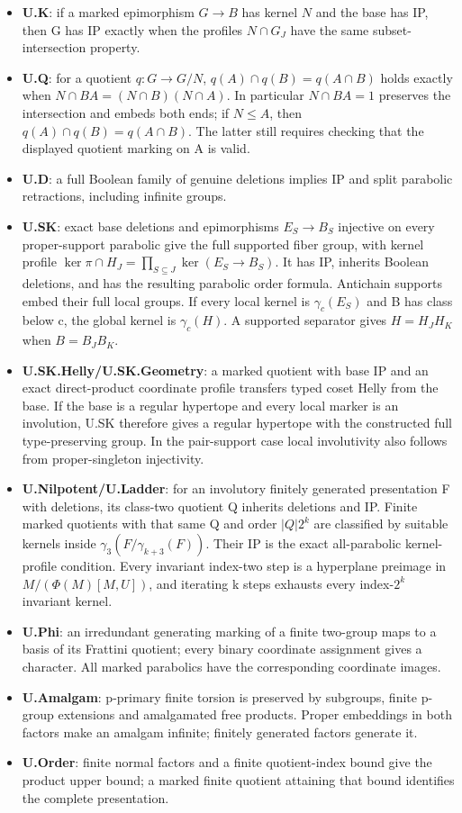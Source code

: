 \documentclass[
  11pt,
  a4paper,
]{article}
\begin{document}
\begin{itemize}
\item
  \textbf{U.K}: if a marked epimorphism \(G\to B\) has kernel \(N\) and
  the base has IP, then G has IP exactly when the profiles \(N\cap G_J\)
  have the same subset-intersection property.
\item
  \textbf{U.Q}: for a quotient \(q:G\to G/N\),
  \(q(A)\cap q(B)=q(A\cap B)\) holds exactly when
  \(N\cap BA=(N\cap B)(N\cap A)\). In particular \(N\cap BA=1\)
  preserves the intersection and embeds both ends; if \(N\le A\), then
  \(q(A)\cap q(B)=q(A\cap B)\). The latter still requires checking that
  the displayed quotient marking on A is valid.
\item
  \textbf{U.D}: a full Boolean family of genuine deletions implies IP
  and split parabolic retractions, including infinite groups.
\item
  \textbf{U.SK}: exact base deletions and epimorphisms \(E_S\to B_S\)
  injective on every proper-support parabolic give the full supported
  fiber group, with kernel profile
  \(\ker\pi\cap H_J=\prod_{S\subseteq J}\ker(E_S\to B_S)\). It has IP,
  inherits Boolean deletions, and has the resulting parabolic order
  formula. Antichain supports embed their full local groups. If every
  local kernel is \(\gamma_c(E_S)\) and B has class below c, the global
  kernel is \(\gamma_c(H)\). A supported separator gives \(H=H_JH_K\)
  when \(B=B_JB_K\).
\item
  \textbf{U.SK.Helly/U.SK.Geometry}: a marked quotient with base IP and
  an exact direct-product coordinate profile transfers typed coset Helly
  from the base. If the base is a regular hypertope and every local
  marker is an involution, U.SK therefore gives a regular hypertope with
  the constructed full type-preserving group. In the pair-support case
  local involutivity also follows from proper-singleton injectivity.
\item
  \textbf{U.Nilpotent/U.Ladder}: for an involutory finitely generated
  presentation F with deletions, its class-two quotient Q inherits
  deletions and IP. Finite marked quotients with that same Q and order
  \(|Q|2^k\) are classified by suitable kernels inside
  \(\gamma_3(F/\gamma_{k+3}(F))\). Their IP is the exact all-parabolic
  kernel-profile condition. Every invariant index-two step is a
  hyperplane preimage in \(M/(\Phi(M)[M,U])\), and iterating k steps
  exhausts every index-\(2^k\) invariant kernel.
\item
  \textbf{U.Phi}: an irredundant generating marking of a finite
  two-group maps to a basis of its Frattini quotient; every binary
  coordinate assignment gives a character. All marked parabolics have
  the corresponding coordinate images.
\item
  \textbf{U.Amalgam}: p-primary finite torsion is preserved by
  subgroups, finite p-group extensions and amalgamated free products.
  Proper embeddings in both factors make an amalgam infinite; finitely
  generated factors generate it.
\item
  \textbf{U.Order}: finite normal factors and a finite quotient-index
  bound give the product upper bound; a marked finite quotient attaining
  that bound identifies the complete presentation.
\end{itemize}
\end{document}
